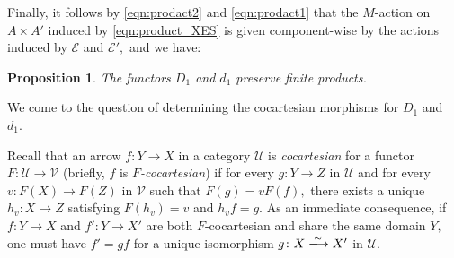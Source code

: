 \documentclass[a4paper]{amsart}
\theoremstyle{plain}
\newtheorem{proposition}[subsection]{Proposition}
\theoremstyle{definition}
\theoremstyle{remark}
\begin{document}
Finally, it follows by \eqref{eqn:prodact2} and \eqref{eqn:prodact1} that the $M$-action on $A\times A'$ induced by \eqref{eqn:product_XES} is given component-wise by the actions induced by $\mathcal{E}$ and $\mathcal{E}',$ and we have:
\begin{proposition}
The functors $D_1$ and $d_1$ preserve finite products.
\end{proposition}
We come to the question of determining the cocartesian morphisms for $D_1$ and $d_1.$

Recall that an arrow $f\colon Y\longrightarrow X$ in a category $\mathcal{U}$ is \emph{cocartesian} for a functor $F\colon\mathcal{U}\longrightarrow\mathcal{V}$ (briefly, $f$ is $F$\emph{-cocartesian}) if for every $g\colon Y\longrightarrow Z$ in $\mathcal{U}$ and for every $v\colon F(X)\longrightarrow F(Z)$ in $\mathcal{V}$ such that $F(g)=v F(f),$ there exists a unique $h_{v}\colon X\longrightarrow Z$ satisfying $F(h_{v})=v$ and $h_{v}f=g.$ As an immediate consequence, if $f\colon Y\longrightarrow X$ and $f'\colon Y\longrightarrow X'$ are both $F$-cocartesian and share the same domain $Y,$ one must have $f'=gf$ for a unique isomorphism $g\colon X\xlongrightarrow{\sim}X'$ in $\mathcal{U}.$
\end{document}

